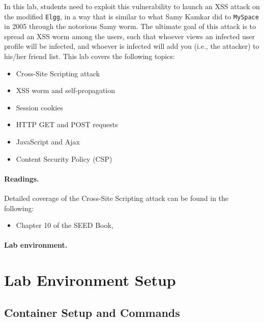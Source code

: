 In this lab, students need to exploit this vulnerability to 
launch an XSS attack on the modified {\tt Elgg}, in a way that is 
similar to what Samy Kamkar
did to {\tt MySpace} in 2005 through the notorious Samy worm. 
The ultimate goal of this attack is to spread an XSS worm among the users,
such that whoever views an infected user profile will be infected,
and whoever is infected will add you (i.e., the attacker) to 
his/her friend list. This lab covers the following topics:

\begin{itemize}[noitemsep]
 \item Cross-Site Scripting attack
 \item XSS worm and self-propagation 
 \item Session cookies
 \item HTTP GET and POST requests
 \item JavaScript and Ajax
 \item Content Security Policy (CSP) 
\end{itemize}


\paragraph{Readings.}
Detailed coverage of the Cross-Site Scripting attack can be found in the following:

\begin{itemize}
\item Chapter 10 of the SEED Book, \seedbook
\end{itemize}


\paragraph{Lab environment.} 
\seedenvironmentB  
\nodependency


\section{Lab Environment Setup}


\subsection{Container Setup and Commands}

